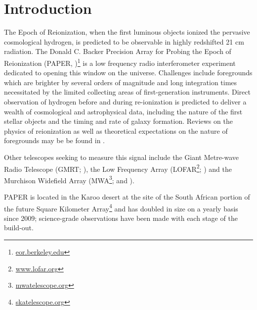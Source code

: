 \documentclass[preprint2]{aastex}
\begin{document}
\section{Introduction}
The Epoch of Reionization, when the first luminous objects ionized the pervasive cosmological hydrogen, is predicted to be observable in highly redshifted 21 cm radiation.  The Donald C. Backer Precision Array for Probing the Epoch of Reionization (PAPER, \cite{Parsons:2010p6757})\footnote{\url{eor.berkeley.edu}} is a low frequency radio interferometer experiment dedicated to opening this window on the universe.  Challenges include foregrounds which are brighter by several orders of magnitude and long integration times necessitated by the limited collecting areas of first-generation instruments. Direct observation of hydrogen before and during re-ionization is predicted to deliver a wealth of cosmological and astrophysical data, including the nature of the first stellar objects and the timing and rate of galaxy formation. Reviews on the physics of reionization as well as theoretical expectations on the nature of foregrounds may be be found in \citet{Furlanetto:2006p2267,Morales:2010p8093,Pritchard:2012p9555}.  

Other telescopes seeking to measure this signal include the Giant Metre-wave Radio Telescope (GMRT; \cite{Paciga:2013p9943}), the Low Frequency Array (LOFAR\footnote{\url{www.lofar.org}}; \cite{Yatawatta:2013p9699}) and the Murchison Widefield Array (MWA\footnote{\url{mwatelescope.org}}; \cite{Bowman:2013p9950} and \cite{Tingay:2013p9022}). 



PAPER is located in the Karoo desert at the site of the South African portion of the future Square Kilometer Array\footnote{\url{skatelescope.org}} and has doubled in size on a yearly basis since 2009; science-grade observations have been made with each stage of the build-out.  
\end{document}
